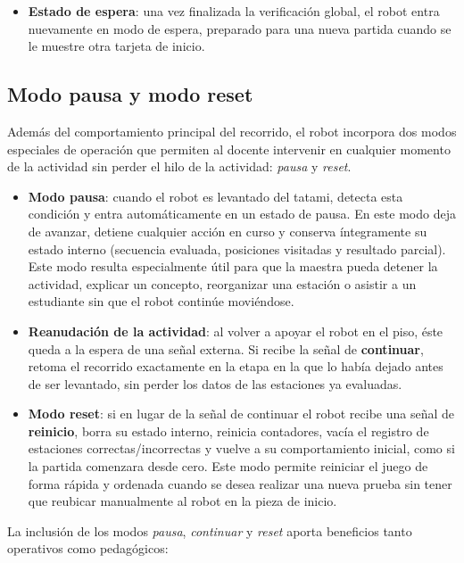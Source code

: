 \documentclass{prgrado}
\begin{document}
\begin{itemize}
    \item \textbf{Estado de espera}: una vez finalizada la verificación global, el robot entra nuevamente en modo de espera, preparado para una nueva partida cuando se le muestre otra tarjeta de inicio.
\end{itemize}

\subsection{Modo pausa y modo reset}

Además del comportamiento principal del recorrido, el robot incorpora dos modos especiales de operación que permiten al docente intervenir en cualquier momento de la actividad sin perder el hilo de la actividad: \emph{pausa} y \emph{reset}.

\begin{itemize}
    \item \textbf{Modo pausa}: cuando el robot es levantado del tatami, detecta esta condición y entra automáticamente en un estado de pausa. En este modo deja de avanzar, detiene cualquier acción en curso y conserva íntegramente su estado interno (secuencia evaluada, posiciones visitadas y resultado parcial). Este modo resulta especialmente útil para que la maestra pueda detener la actividad, explicar un concepto, reorganizar una estación o asistir a un estudiante sin que el robot continúe moviéndose.
    
    \item \textbf{Reanudación de la actividad}: al volver a apoyar el robot en el piso, éste queda a la espera de una señal externa. Si recibe la señal de \textbf{continuar}, retoma el recorrido exactamente en la etapa en la que lo había dejado antes de ser levantado, sin perder los datos de las estaciones ya evaluadas.
    
    \item \textbf{Modo reset}: si en lugar de la señal de continuar el robot recibe una señal de \textbf{reinicio}, borra su estado interno, reinicia contadores, vacía el registro de estaciones correctas/incorrectas y vuelve a su comportamiento inicial, como si la partida comenzara desde cero. Este modo permite reiniciar el juego de forma rápida y ordenada cuando se desea realizar una nueva prueba sin tener que reubicar manualmente al robot en la pieza de inicio.
\end{itemize}


La inclusión de los modos \emph{pausa}, \emph{continuar} y \emph{reset} aporta beneficios tanto operativos como pedagógicos:
\end{document}
